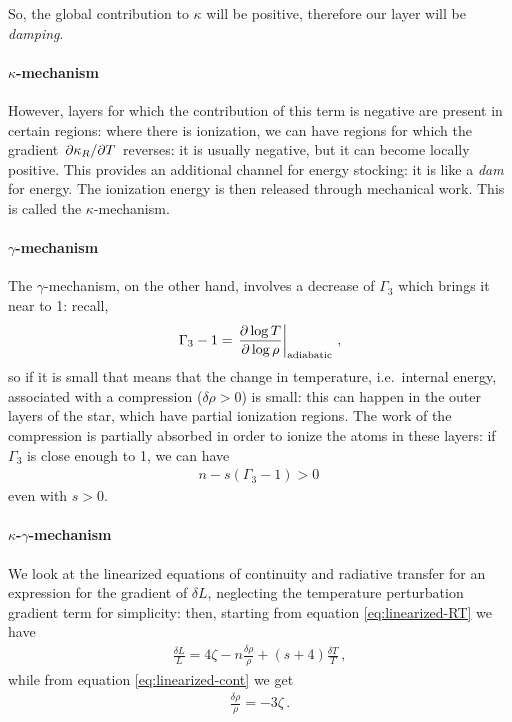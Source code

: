 \documentclass[main.tex]{subfiles}
\begin{document}
So, the global contribution to \(\kappa \) will be positive, therefore our layer will be \emph{damping}.

\paragraph{\(\kappa \)-mechanism}

However, layers for which the contribution of this term is negative are present in certain regions: where there is ionization, we can have regions for which the gradient \(\pdv*{\kappa_R}{T}\) reverses: it is usually negative, but it can become locally positive.
This provides an additional channel for energy stocking: it is like a \emph{dam} for energy.
The ionization energy is then released through mechanical work.
This is called the \(\kappa \)-mechanism.

\paragraph{\(\gamma \)-mechanism}

The \(\gamma \)-mechanism, on the other hand, involves a decrease of \(\Gamma_3\) which brings it near to 1: recall, 
%
\begin{align}
\Gamma_3 -1 = \eval{\pdv{\log T}{\log \rho }}_{\text{adiabatic}}
\,,
\end{align}
%
so if it is small that means that the change in temperature, i.e.\ internal energy, associated with a compression (\(\delta \rho >0\)) is small: this can happen in the outer layers of the star, which have partial ionization regions. The work of the compression is partially absorbed in order to ionize the atoms in these layers: if \(\Gamma_3 \) is close enough to 1, we can have 
%
\begin{align}
n - s (\Gamma_3 -1) >0 
\,
\end{align}
%
even with \(s > 0\).

\paragraph{\(\kappa \)-\(\gamma \)-mechanism}

We look at the linearized equations of continuity and radiative transfer for an expression for the gradient of \(\delta L\), neglecting the temperature perturbation gradient term for simplicity: then, starting from equation \eqref{eq:linearized-RT} we have 
%
\begin{align}
\frac{ \delta L}{L} =
4 \zeta 
- n \frac{ \delta \rho }{\rho }
+ (s+4) \frac{ \delta T}{T}
\,,
\end{align}
%
while from equation \eqref{eq:linearized-cont} we get
%
\begin{align}
\frac{ \delta \rho }{\rho } = - 3 \zeta 
\,.
\end{align}
\end{document}
